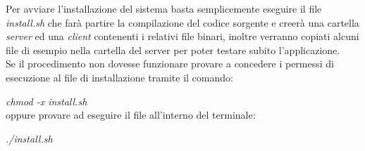 Per avviare l'installazione del sistema basta semplicemente eseguire il file
\emph{install.sh} che farà partire la compilazione del codice sorgente e 
creerà una cartella \emph{server} ed una \emph{client} contenenti i
relativi file binari, inoltre verranno copiati alcuni file di esempio nella
cartella del server per poter testare subito l'applicazione.\\
Se il procedimento non dovesse funzionare provare a concedere i permessi di
esecuzione al file di installazione tramite il comando:

\emph{chmod -x install.sh}\\
oppure provare ad eseguire il file all'interno del terminale:

\emph{./install.sh}
